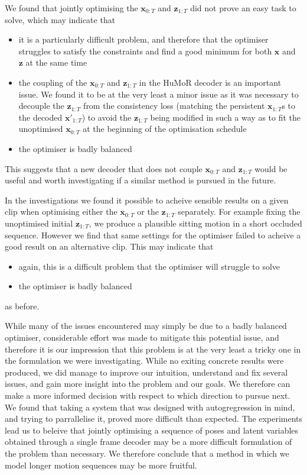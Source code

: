 We found that jointly optimising the $\mathbf{x}_{0:T}$ and $\mathbf{z}_{1:T}$ did not prove an easy task to solve, which may indicate that
\begin{itemize}
    \item it is a particularly difficult problem, and therefore that the optimiser struggles to satisfy the constraints and find a good minimum for both $\mathbf{x}$ and $\mathbf{z}$ at the same time
    \item the coupling of the $\mathbf{x}_{0:T}$ and $\mathbf{z}_{1:T}$ in the HuMoR decoder is an important issue. We found it to be at the very least a minor issue as it was necessary to decouple the $\mathbf{z}_{1:T}$ from the consistency loss (matching the persistent $\mathbf{x}_{1:T}$s to the decoded $\mathbf{x'}_{1:T}$) to avoid the $\mathbf{z}_{1:T}$ being modified in such a way as to fit the unoptimised $\mathbf{x}_{0:T}$ at the beginning of the optimisation schedule
    \item the optimiser is badly balanced
\end{itemize}
This suggests that a new decoder that does not couple $\mathbf{x}_{0:T}$ and $\mathbf{z}_{1:T}$ would be useful and worth investigating if a similar method is pursued in the future.

In the investigations we found it possible to acheive sensible results on a given clip when optimising either the $\mathbf{x}_{0:T}$ or the $\mathbf{z}_{1:T}$ separately. For example fixing the unoptimised initial $\mathbf{z}_{1:T}$, we produce a plausible sitting motion in a short occluded sequence. However we find that same settings for the optimiser failed to acheive a good result on an alternative clip. This may indicate that 
\begin{itemize}
    \item again, this is a difficult problem that the optimiser will struggle to solve
    \item the optimiser is badly balanced
\end{itemize} as before.

While many of the issues encountered may simply be due to a badly balanced optimiser, considerable effort was made to mitigate this potential issue, and therefore it is our impression that this problem is at the very least a tricky one in the formulation we were investigating. While no exiting concrete results were produced, we did manage to improve our intuition, understand and fix several issues, and gain more insight into the problem and our goals. We therefore can make a more informed decision with respect to which direction to pursue next. \\
We found that taking a system that was designed with autogregression in mind, and trying to parrallelise it, proved more difficult than expected. The experiments lead us to beleive that jointly optimising a sequence of poses and latent variables obtained through a single frame decoder may be a more difficult formulation of the problem than necessary. We therefore conclude that a method in which we model longer motion sequences may be more fruitful.